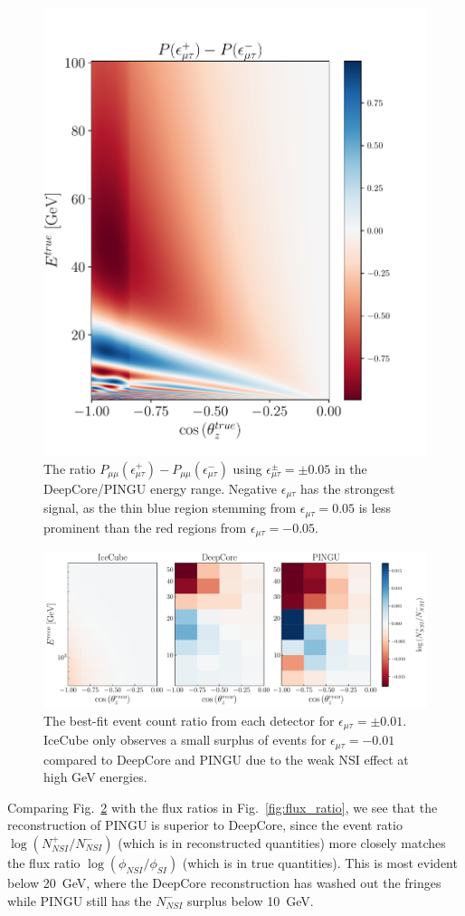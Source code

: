 \documentclass[draft=True]{revtex4-2}
\newcommand{\emt}{\ensuremath{\epsilon_{\mu\tau}}}
\begin{document}
{\begin{figure}[!tb]
   \includegraphics[width=0.4\linewidth]{figures/Pmm_asymmetry.pdf}
   \caption{The ratio $P_{\mu\mu}(\epsilon^+_{\mu\tau}) - P_{\mu\mu}(\epsilon^-_{\mu\tau})$ using  $\epsilon^\pm_{\mu\tau} = \pm 0.05$ in the DeepCore/PINGU energy range. Negative $\emt$ has the strongest signal, as the thin blue 
region stemming from $\emt = 0.05$ is less prominent than the red regions from $\emt=-0.05$.}\label{fig:Pmm_asymmetry}
\end{figure}%
\begin{figure}[!tb]
   \includegraphics[width=0.7\linewidth]{figures/emt_events.pdf}
   \caption{The best-fit event count ratio from each detector for $\emt = \pm 0.01$. IceCube only observes a small surplus of events for $\emt=-0.01$ compared to 
   DeepCore and PINGU due to the weak NSI effect at high \si{\GeV} energies.}\label{fig:emt_events}%
 \end{figure}


Comparing Fig.~\ref{fig:emt_events} with the flux ratios in Fig.~\ref{fig:flux_ratio}, we see that the reconstruction of PINGU is
superior to DeepCore, since the event ratio $\log{(N^+_{NSI}/N^-_{NSI})}$ (which is in reconstructed quantities) more closely matches the flux ratio $\log{(\phi_{NSI}/\phi_{SI})}$ (which is in true quantities).
This is most evident below \SI{20}{\GeV}, where the DeepCore reconstruction has washed out the fringes while PINGU still has the $N^-_{NSI}$ surplus below \SI{10}{\GeV}.

}
\end{document}
